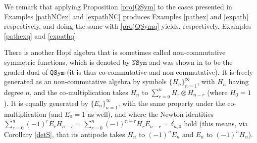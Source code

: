 \documentclass{article}
\theoremstyle{definition}
\begin{document}
We remark that applying Proposition \ref{projQSym} to the cases presented in Examples \ref{pathNCex} and \ref{expathNC} produces Examples \ref{pathex} and \ref{expath} respectively, and doing the same with \ref{projQSymq} yields, respectively, Examples \ref{pathexq} and \ref{expathq}.

\medskip

There is another Hopf algebra that is sometimes called non-commutative symmetric functions, which is denoted by $\mathtt{NSym}$ and was shown in \cite{[MR]} to be the graded dual of $\mathtt{QSym}$ (it is thus co-commutative and non-commutative). It is freely generated as an non-commutative algebra by symbols $\{H_{n}\}_{n=1}^{\infty}$, with $H_{n}$ having degree $n$, and the co-multiplication takes $H_{n}$ to $\sum_{r=0}^{n}H_{r} \otimes H_{n-r}$ (where $H_{0}=1$). It is equally generated by $\{E_{n}\}_{n=1}^{\infty}$, with the same property under the co-multiplication (and $E_{0}=1$ as well), and where the Newton identities $\sum_{r=0}^{n}(-1)^{r}E_{r}H_{n-r}=\sum_{r=0}^{n}(-1)^{n-r}H_{r}E_{n-r}=\delta_{n,0}$ hold (this means, via Corollary \ref{detS}, that its antipode takes $H_{n}$ to $(-1)^{n}E_{n}$ and $E_{n}$ to $(-1)^{n}H_{n}$).
\end{document}
